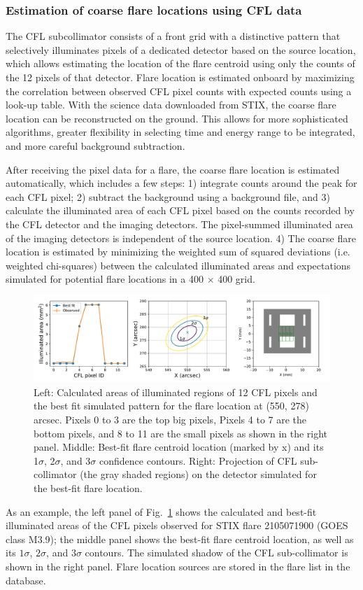 \documentclass[referee]{aa} %
\begin{document}
\subsubsection{Estimation of coarse flare locations using CFL data}
The CFL subcollimator consists of a front grid with
a distinctive pattern that selectively illuminates pixels of a 
dedicated detector based on the source location, which allows
estimating the location of the flare centroid using only the counts of the 12 pixels 
of that detector. 
Flare location is estimated onboard by maximizing the correlation between observed CFL pixel counts with expected counts using a look-up table. 
With the science data downloaded from STIX,
the coarse flare location can be reconstructed on the ground. 
This allows for more sophisticated algorithms, greater flexibility in selecting time and energy range to be integrated, and more careful background subtraction.

After receiving the pixel data for a flare, 
the coarse flare location is estimated automatically, which includes a few steps: 1) integrate counts around the peak for each CFL pixel; 
2) subtract the background 
using a background file, and 3) calculate the illuminated area of each CFL pixel based on the 
counts recorded by the CFL detector and the imaging detectors. The pixel-summed illuminated area of the imaging detectors is independent of the source location. 4) The coarse flare location is estimated by minimizing the weighted sum of squared deviations (i.e. weighted chi-squares) between the calculated illuminated areas and expectations simulated for potential flare locations in a 400 $\times$ 400 grid.
\begin{figure}
  \centering
  \includegraphics[width=0.95\linewidth]{figures/cflMay07.pdf}
  \caption{
   Left: Calculated areas of illuminated regions of 12 CFL pixels and the best fit simulated pattern for the flare location at (550, 278) arcsec. Pixels 0 to 3 are the top big pixels, Pixels 4 to 7 are the bottom pixels, and 8 to 11 are the small pixels as shown in the right panel.
   Middle: Best-fit flare centroid location (marked by x) and its 1$\sigma$, 2$\sigma$, and 3$\sigma$ confidence contours.
    Right: Projection of  CFL sub-collimator (the gray shaded regions) on the detector 
  simulated for the best-fit flare location. }
  \label{fig:cfl}
\end{figure}
As an example, the left panel of Fig.~\ref{fig:cfl} shows the calculated and best-fit illuminated areas of the CFL pixels observed for STIX flare 2105071900 (GOES class M3.9);  the middle panel shows the best-fit 
flare centroid location, as well as its $1\sigma$, $2\sigma$, and $3\sigma$ contours. 
The simulated shadow of the CFL sub-collimator is shown in the right panel. 
Flare location sources are stored in the flare list in the database. 
\end{document}
